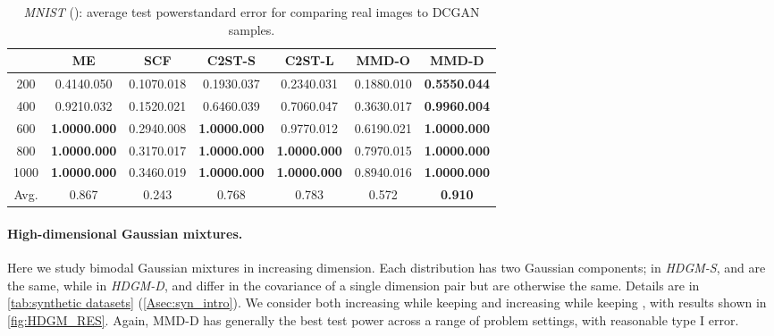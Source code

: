 \documentclass{article}
\newcommand{\mnstd}[2]{#1{\scriptsize#2}}
\begin{document}
\begin{table*}[ht]
\centering
  \footnotesize
  \caption{\emph{MNIST} (): average test powerstandard error for comparing  real images to  DCGAN samples. } \label{tab:MNIST_RES1}
\vspace{1mm}
\begin{tabular}{c|cccccc}
\toprule
 & ME & SCF & C2ST-S& C2ST-L & MMD-O & MMD-D \\
\midrule
\phantom{1}200 & \mnstd{0.414}{0.050} & \mnstd{0.107}{0.018} & \mnstd{0.193}{0.037} & \mnstd{0.234}{0.031} & \mnstd{0.188}{0.010} & \mnstd{\bf 0.555}{0.044}  \\
\phantom{1}400 & \mnstd{0.921}{0.032} & \mnstd{0.152}{0.021} & \mnstd{0.646}{0.039} & \mnstd{0.706}{0.047} & \mnstd{0.363}{0.017} & \mnstd{\bf 0.996}{0.004} \\
\phantom{1}600 & \mnstd{\bf 1.000}{0.000} & \mnstd{0.294}{0.008} & \mnstd{\bf 1.000}{0.000} & \mnstd{0.977}{0.012} & \mnstd{0.619}{0.021} & \mnstd{\bf 1.000}{0.000} \\
\phantom{1}800 & \mnstd{\bf 1.000}{0.000} & \mnstd{0.317}{0.017} & \mnstd{\bf 1.000}{0.000} & \mnstd{\bf 1.000}{0.000} & \mnstd{0.797}{0.015} & \mnstd{\bf 1.000}{0.000} \\
          1000 & \mnstd{\bf 1.000}{0.000} & \mnstd{0.346}{0.019} & \mnstd{\bf 1.000}{0.000} & \mnstd{\bf 1.000}{0.000} & \mnstd{0.894}{0.016} & \mnstd{\bf 1.000}{0.000} \\
\midrule
Avg. & 0.867 & 0.243 & 0.768 & 0.783 & 0.572 & {\bf 0.910} \\
\bottomrule
\end{tabular}
\vspace{-1em}
\end{table*}

\vspace{-1.5ex}\paragraph{High-dimensional Gaussian mixtures.}
Here we study bimodal Gaussian mixtures in increasing dimension.
Each distribution has two Gaussian components;
in \emph{HDGM-S},  and  are the same,
while in \emph{HDGM-D},  and  differ in the covariance of a single dimension pair but are otherwise the same.
Details are in \cref{tab:synthetic datasets} (\cref{Asec:syn_intro}).
We consider both increasing  while keeping 
and increasing  while keeping ,
with results shown in \cref{fig:HDGM_RES}.
Again, MMD-D has generally the best test power across a range of problem settings,
with reasonable type I error.
\end{document}
